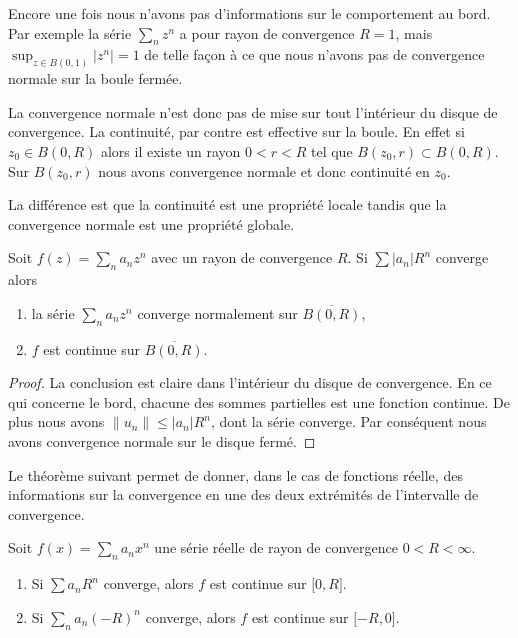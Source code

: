 \begin{example}
    Encore une fois nous n'avons pas d'informations sur le comportement au bord. Par exemple la série \( \sum_nz^n\) a pour rayon de convergence \( R=1\), mais \( \sup_{z\in B(0,1)}| z^n |=1\) de telle façon à ce que nous n'avons pas de convergence normale sur la boule fermée.
\end{example}
La convergence normale n'est donc pas de mise sur tout l'intérieur du disque de convergence. La continuité, par contre est effective sur la boule. En effet si \( z_0\in B(0,R)\) alors il existe un rayon \( 0<r<R\) tel que \( B(z_0,r)\subset B(0,R)\). Sur \( B(z_0,r)\) nous avons convergence normale et donc continuité en \( z_0\).

La différence est que la continuité est une propriété locale tandis que la convergence normale est une propriété globale.

\begin{proposition}
    Soit \( f(z)=\sum_na_nz^n\) avec un rayon de convergence \( R\). Si \( \sum | a_n |R^n\) converge alors
    \begin{enumerate}
        \item
            la série \( \sum_na_nz^n\) converge normalement sur \( \overline{ B(0,R) }\),
        \item
            \( f\) est continue sur \( \overline{ B(0,R) }\).
    \end{enumerate}
\end{proposition}

\begin{proof}
    La conclusion est claire dans l'intérieur du disque de convergence. En ce qui concerne le bord, chacune des sommes partielles est une fonction continue. De plus nous avons \( \| u_n \|\leq | a_n |R^n\), dont la série converge. Par conséquent nous avons convergence normale sur le disque fermé.
\end{proof}

Le théorème suivant permet de donner, dans le cas de fonctions réelle, des informations sur la convergence en une des deux extrémités de l'intervalle de convergence.
\begin{theorem} \label{ThoLUXVjs}
    Soit \( f(x)=\sum_na_nx^n\) une série réelle de rayon de convergence \( 0<R<\infty\).
    \begin{enumerate}
        \item
            Si \( \sum a_nR^n\) converge, alors \( f\) est continue sur \( \mathopen[ 0 , R \mathclose]\).
        \item
            Si \( \sum_na_n(-R)^n\) converge, alors \( f\) est continue sur \( \mathopen[ -R , 0 \mathclose]\).
    \end{enumerate}
\end{theorem}

